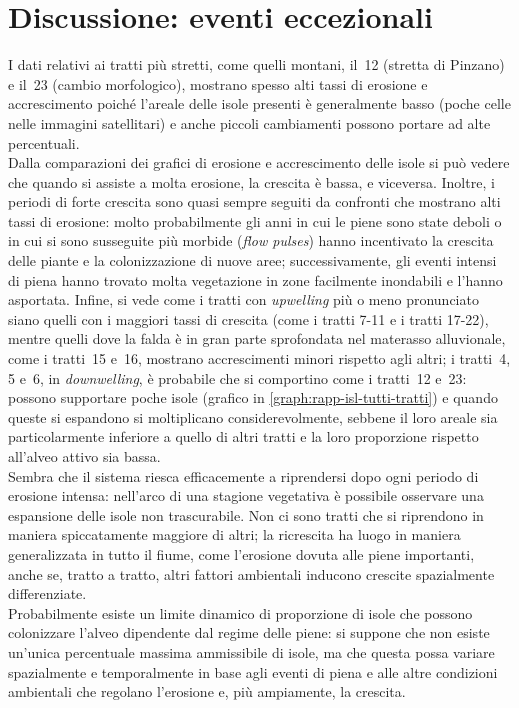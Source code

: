 \section{Discussione: eventi eccezionali}
I dati relativi ai tratti più stretti, come quelli montani, il~12 (stretta di Pinzano) e il~23 (cambio morfologico), mostrano spesso alti tassi di erosione e accrescimento poiché l'areale delle isole presenti è generalmente basso (poche celle nelle immagini satellitari) e anche piccoli cambiamenti possono portare ad alte percentuali.
\\
Dalla comparazioni dei grafici di erosione e accrescimento delle isole si può vedere che quando si assiste a molta erosione, la crescita è bassa, e viceversa.
Inoltre, i periodi di forte crescita sono quasi sempre seguiti da confronti che mostrano alti tassi di erosione: molto probabilmente gli anni in cui le piene sono state deboli o in cui si sono susseguite più morbide (\emph{flow pulses}) hanno incentivato la crescita delle piante e la colonizzazione di nuove aree; successivamente, gli eventi intensi di piena hanno trovato molta vegetazione in zone facilmente inondabili e l'hanno asportata.
Infine, si vede come i tratti con \emph{upwelling} più o meno pronunciato siano quelli con i maggiori tassi di crescita (come i tratti 7-11 e i tratti 17-22), mentre quelli dove la falda è in gran parte sprofondata nel materasso alluvionale, come i tratti~15 e~16, mostrano accrescimenti minori rispetto agli altri;
i tratti~4, 5 e~6, in \emph{downwelling}, è probabile che si comportino come i tratti~12 e~23: possono supportare poche isole (grafico in \cref{graph:rapp-isl-tutti-tratti}) e quando queste si espandono si moltiplicano considerevolmente, sebbene il loro areale sia particolarmente inferiore a quello di altri tratti e la loro proporzione rispetto all'alveo attivo sia bassa.
\\
Sembra che il sistema riesca efficacemente a riprendersi dopo ogni periodo di erosione intensa: nell'arco di una stagione vegetativa è possibile osservare una espansione delle isole non trascurabile.
Non ci sono tratti che si riprendono in maniera spiccatamente maggiore di altri; la ricrescita ha luogo in maniera generalizzata in tutto il fiume, come l'erosione dovuta alle piene importanti, anche se, tratto a tratto, altri fattori ambientali inducono crescite spazialmente differenziate.
\\
Probabilmente esiste un limite dinamico di proporzione di isole che possono colonizzare l'alveo dipendente dal regime delle piene: si suppone che non esiste un'unica percentuale massima ammissibile di isole, ma che questa possa variare spazialmente e temporalmente in base agli eventi di piena e alle altre condizioni ambientali che regolano l'erosione e, più ampiamente, la crescita.

